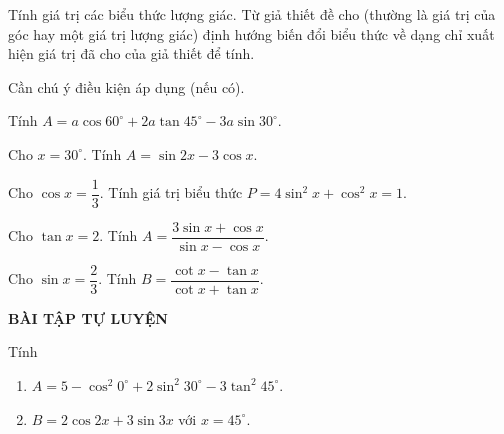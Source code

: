 \begin{dang}{Tính giá trị các biểu thức lượng giác.}
	Từ giả thiết đề cho (thường là giá trị của góc hay một giá trị lượng giác) định hướng biến đổi biểu thức về dạng chỉ xuất hiện giá trị đã cho của giả thiết để tính.
	\begin{note}
		Cần chú ý điều kiện áp dụng (nếu có).
	\end{note}
\end{dang}
\begin{vd}%
Tính $A=a\cos60^{\circ}+2a\tan45^{\circ}-3a\sin30^{\circ}$.
\end{vd}
\begin{vd}%
Cho $x=30^{\circ}$. Tính $A=\sin 2x-3\cos x$.
\end{vd}
\begin{vd}%
Cho $\cos x=\dfrac{1}{3}$. Tính giá trị biểu thức $P=4\sin^2 x+\cos^2 x=1$.
\end{vd}
\begin{vd}%
Cho $\tan x=2$. Tính $A=\dfrac{3\sin x+\cos x}{\sin x-\cos x}$.
\end{vd}
\begin{vd}%
Cho $\sin x=\dfrac{2}{3}$. Tính $B=\dfrac{\cot x-\tan x}{\cot x+\tan x}$.
\end{vd}
\begin{center}
\textbf{BÀI TẬP TỰ LUYỆN}
\end{center}
\begin{bt}%
Tính
\begin{enumerate}[\indent a.]
	\item $A=5-\cos^2 0^{\circ}+2\sin^2 30^{\circ}-3\tan^2 45^{\circ}$.
	\item $B=2\cos 2x+3\sin 3x$ với $x=45^{\circ}$.
\end{enumerate}
\end{bt}
